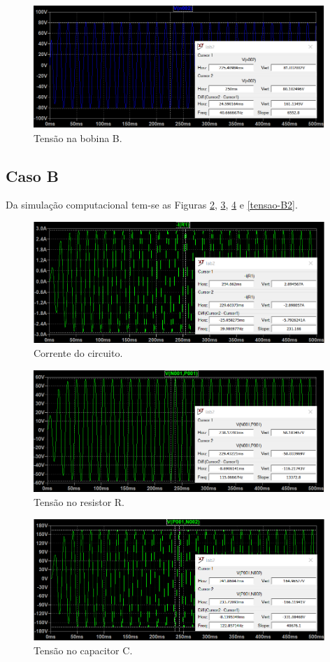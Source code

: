 \documentclass[a4paper,12pt,oneside,openany,table,xcdraw]{article}
\begin{document}
\begin{figure}[H]
\centering
\captionsetup{font=scriptsize}
\includegraphics[width=11cm]{tensao-B1}
\caption{Tensão na bobina B.}
\label{tensao-B1}
\end{figure}

\subsection{Caso B}
Da simulação computacional tem-se as Figuras \ref{corrente2}, \ref{tensao-R2}, \ref{tensao-C2} e \ref{tensao-B2}.
\begin{figure}[H]
\centering
\captionsetup{font=scriptsize}
\includegraphics[width=11cm]{corrente2}
\caption{Corrente do circuito.}
\label{corrente2}
\end{figure}
\begin{figure}[H]
\centering
\captionsetup{font=scriptsize}
\includegraphics[width=11cm]{tensao-R2}
\caption{Tensão no resistor R.}
\label{tensao-R2}
\end{figure}
\begin{figure}[H]
\centering
\captionsetup{font=scriptsize}
\includegraphics[width=11cm]{tensao-C2}
\caption{Tensão no capacitor C.}
\label{tensao-C2}
\end{figure}
\end{document}
